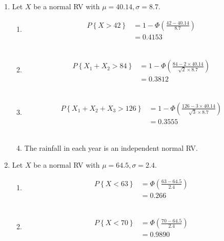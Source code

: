 \begin{enumerate}
	
	\item Let $ X $ be a normal RV with $ \mu = 40.14, \sigma = 8.7 $.\\
			
		\begin{enumerate}
			\item \begin{align}
				P \left\{X > 42\right\} &= 1 - \Phi \left(\frac{42 - 40.14}{8.7}\right) \nonumber \\
				&= 0.4153
			\end{align}\\
			
			\item \begin{align}
				P \left\{X_1 + X_2 > 84\right\} &= 1 - \Phi \left(\frac{84 - 2 \times 40.14}{\sqrt{2} \times 8.7}\right) \nonumber \\
				&= 0.3812
			\end{align}\\
			
			\item \begin{align}
				P \left\{X_1 + X_2 +X_3 > 126\right\} &= 1 - \Phi \left(\frac{126 - 3 \times 40.14}{\sqrt{3} \times 8.7}\right) \nonumber \\
				&= 0.3555
			\end{align}\\
			
			\item The rainfall in each year is an independent normal RV.
		\end{enumerate}
	
	
	\item Let $ X $ be a normal RV with $ \mu = 64.5, \sigma = 2.4 $.\\
			
		\begin{enumerate}
			\item \begin{align}
				P \left\{X < 63\right\} &= \Phi \left(\frac{63 - 64.5}{2.4}\right) \nonumber \\
				&= 0.266
			\end{align}\\
			
			\item \begin{align}
				P \left\{X < 70\right\} &= \Phi \left(\frac{70 - 64.5}{2.4}\right) \nonumber \\
				&= 0.9890
			\end{align}\\
			

\end{enumerate}
\end{enumerate}
